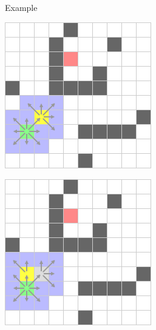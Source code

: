 \documentclass{presentation}
\begin{document}
\begin{frame}{Example}
	\begin{minipage}{0.2\textwidth}
		\includegraphics[width=\textwidth]{figures/A-Stern_geschnitten(241x241)/3.png}
	\end{minipage}%
	\hfill%
	\begin{minipage}{0.2\textwidth}
		\includegraphics[width=\textwidth]{figures/A-Stern_geschnitten(241x241)/4.png}

\end{minipage}
\end{frame}
\end{document}
